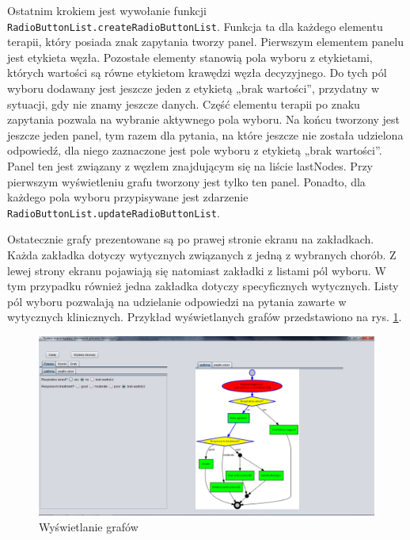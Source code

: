 Ostatnim krokiem jest wywołanie funkcji \texttt{RadioButtonList.createRadioButtonList}. 
Funkcja ta dla każdego elementu terapii, który posiada znak zapytania tworzy panel. Pierwszym elementem panelu jest etykieta węzła. 
Pozostałe elementy stanowią pola wyboru z etykietami, których wartości są równe etykietom krawędzi węzła decyzyjnego. 
Do tych pól wyboru dodawany jest jeszcze jeden z etykietą „brak wartości”, przydatny w sytuacji, gdy nie znamy jeszcze danych. 
Część elementu terapii po znaku zapytania pozwala na wybranie aktywnego pola wyboru. 
Na końcu tworzony jest jeszcze jeden panel, tym razem dla pytania, na które jeszcze nie została udzielona odpowiedź, dla niego zaznaczone jest pole wyboru z etykietą „brak wartości”. Panel ten jest związany z węzłem znajdującym się na liście lastNodes. Przy pierwszym wyświetleniu grafu tworzony jest tylko ten panel. Ponadto, dla każdego pola wyboru przypisywane jest zdarzenie \texttt{RadioButtonList.updateRadioButtonList}.
 
Ostatecznie grafy prezentowane są po prawej stronie ekranu na zakładkach. Każda zakładka dotyczy wytycznych związanych z jedną z wybranych chorób. Z lewej strony ekranu pojawiają się natomiast zakładki z listami pól wyboru. W tym przypadku również jedna zakładka dotyczy specyficznych wytycznych. Listy pól wyboru pozwalają na udzielanie odpowiedzi na pytania zawarte w wytycznych klinicznych. 
Przykład wyświetlanych grafów przedstawiono na rys. \ref{fig:wyswietlanie_grafow}.
\begin{figure}[H]
\centering
\includegraphics[width=\textwidth]{img/wyswietlanie_grafow.png}
\caption{Wyświetlanie grafów}
\label{fig:wyswietlanie_grafow}
\end{figure}

